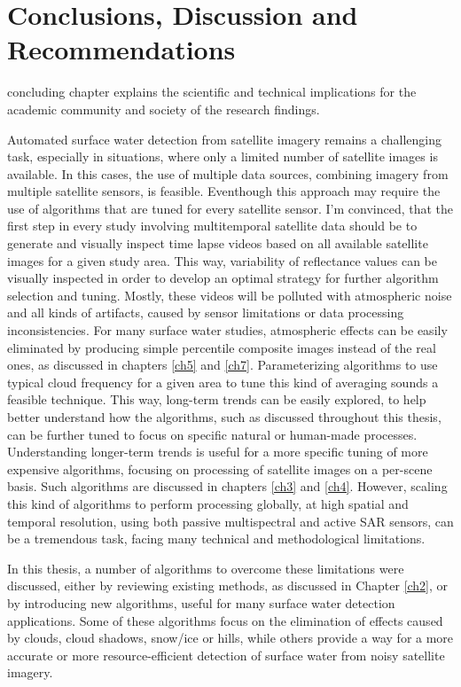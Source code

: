 \chapter{Conclusions, Discussion and Recommendations}
\label{ch8-conclusion}

 concluding chapter explains the scientific and technical implications for the academic community and society of the research findings. 

Automated surface water detection from satellite imagery remains a challenging task, especially in situations, where only a limited number of satellite images is available. In this cases, the use of multiple data sources, combining imagery from multiple satellite sensors, is feasible. Eventhough this approach may require the use of algorithms that are tuned for every satellite sensor. I'm convinced, that the first step in every study involving multitemporal satellite data should be to generate and visually inspect time lapse videos based on all available satellite images for a given study area. This way, variability of reflectance values can be visually inspected in order to develop an optimal strategy for further algorithm selection and tuning. Mostly, these videos will be polluted with atmospheric noise and all kinds of artifacts, caused by sensor limitations or data processing inconsistencies. For many surface water studies, atmospheric effects can be easily eliminated by producing simple percentile composite images instead of the real ones, as discussed in chapters \ref{ch5} and \ref{ch7}. Parameterizing algorithms to use typical cloud frequency for a given area to tune this kind of averaging sounds a feasible technique. This way, long-term trends can be easily explored, to help better understand how the algorithms, such as discussed throughout this thesis, can be further tuned to focus on specific natural or human-made processes. Understanding longer-term trends is useful for a more specific tuning of more expensive algorithms, focusing on processing of satellite images on a per-scene basis. Such algorithms are discussed in chapters \ref{ch3} and \ref{ch4}. However, scaling this kind of algorithms to perform processing globally, at high spatial and temporal resolution, using both passive multispectral and active \gls{SAR} sensors, can be a tremendous task, facing many technical and methodological limitations.

In this thesis, a number of algorithms to overcome these limitations were discussed, either by reviewing existing methods, as discussed in Chapter \ref{ch2}, or by introducing new algorithms, useful for many surface water detection applications. Some of these algorithms focus on the elimination of effects caused by clouds, cloud shadows, snow/ice or hills, while others provide a way for a more accurate or more resource-efficient detection of surface water from noisy satellite imagery.

